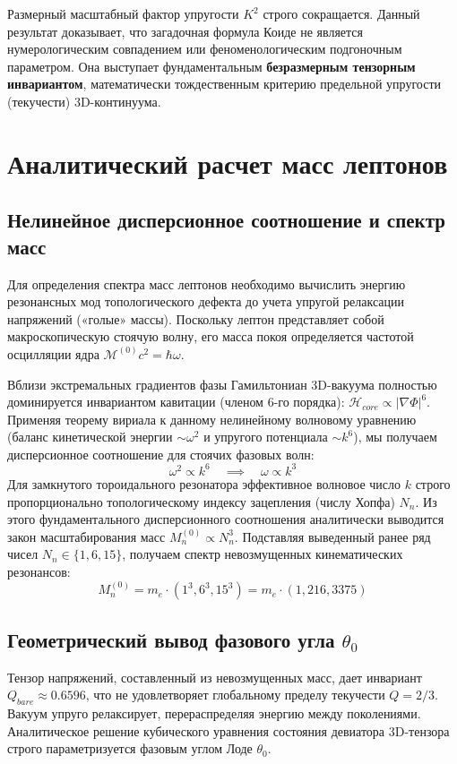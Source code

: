 \documentclass[12pt,a4paper]{article}
\begin{document}
	Размерный масштабный фактор упругости $K^2$ строго сокращается. Данный результат доказывает, что загадочная формула Коиде не является нумерологическим совпадением или феноменологическим подгоночным параметром. Она выступает фундаментальным \textbf{безразмерным тензорным инвариантом}, математически тождественным критерию предельной упругости (текучести) 3D-континуума.
		
	\section{Аналитический расчет масс лептонов}
	
	\subsection{Нелинейное дисперсионное соотношение и спектр масс}
	Для определения спектра масс лептонов необходимо вычислить энергию резонансных мод топологического дефекта до учета упругой релаксации напряжений («голые» массы). Поскольку лептон представляет собой макроскопическую стоячую волну, его масса покоя определяется частотой осцилляции ядра $\mathcal{M}^{(0)} c^2 = \hbar \omega$.
	
	Вблизи экстремальных градиентов фазы Гамильтониан 3D-вакуума полностью доминируется инвариантом кавитации (членом 6-го порядка): $\mathcal{H}_{core} \propto |\nabla \Phi|^6$. 
	Применяя теорему вириала к данному нелинейному волновому уравнению (баланс кинетической энергии $\sim \omega^2$ и упругого потенциала $\sim k^6$), мы получаем дисперсионное соотношение для стоячих фазовых волн:
	\begin{equation}
		\omega^2 \propto k^6 \quad \implies \quad \omega \propto k^3
	\end{equation}
	Для замкнутого тороидального резонатора эффективное волновое число $k$ строго пропорционально топологическому индексу зацепления (числу Хопфа) $N_n$. 
	Из этого фундаментального дисперсионного соотношения аналитически выводится закон масштабирования масс $M_n^{(0)} \propto N_n^3$.
	Подставляя выведенный ранее ряд чисел $N_n \in \{1, 6, 15\}$, получаем спектр невозмущенных кинематических резонансов:
	\begin{equation}
		M_n^{(0)} = m_e \cdot (1^3, 6^3, 15^3) = m_e \cdot (1, 216, 3375)
	\end{equation}
	
	\subsection{Геометрический вывод фазового угла $\theta_0$}
	Тензор напряжений, составленный из невозмущенных масс, дает инвариант $Q_{bare} \approx 0.6596$, что не удовлетворяет глобальному пределу текучести $Q=2/3$. Вакуум упруго релаксирует, перераспределяя энергию между поколениями. Аналитическое решение кубического уравнения состояния девиатора 3D-тензора строго параметризуется фазовым углом Лоде $\theta_0$.
	
\end{document}
